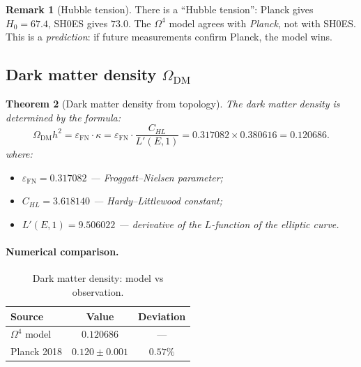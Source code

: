 \documentclass[11pt,a4paper]{article}
\newcommand{\Om}{\Omega^4}
\newcommand{\epsFN}{\varepsilon_{\text{FN}}}
\newtheorem{theorem}{Theorem}[section]
\theoremstyle{definition}
\newtheorem{remark}[theorem]{Remark}
\begin{document}
\begin{remark}[Hubble tension]
\label{rem:hubble-tension}
There is a ``Hubble tension'': Planck gives $H_0 = 67.4$, 
SH0ES gives $73.0$. The $\Om$ model agrees with 
\emph{Planck}, not with SH0ES. This is a \emph{prediction}: 
if future measurements confirm Planck, the model wins.
\end{remark}

\subsection{Dark matter density $\Omega_{\text{DM}}$}
\label{subsec:omega-dm}

\begin{theorem}[Dark matter density from topology]
\label{thm:omega-dm}
The dark matter density is determined by the formula:
\begin{equation}
    \boxed{
    \Omega_{\text{DM}} h^2 = \epsFN \cdot \kappa
    = \epsFN \cdot \frac{C_{HL}}{L'(E, 1)}
    = 0.317082 \times 0.380616 = 0.120686.
    }
    \label{eq:omega-dm-main}
\end{equation}
where:
\begin{itemize}
    \item $\epsFN = 0.317082$ — Froggatt--Nielsen parameter;
    \item $C_{HL} = 3.618140$ — Hardy--Littlewood constant;
    \item $L'(E, 1) = 9.506022$ — derivative of the $L$-function 
          of the elliptic curve.
\end{itemize}
\end{theorem}

\paragraph{Numerical comparison.}
\begin{table}[htbp]
\centering
\caption{Dark matter density: model vs observation.}
\label{tab:omega-dm-comparison}
\begin{tabular}{lcc}
\toprule
Source & Value & Deviation \\ 
\midrule
$\Om$ model & $0.120686$ & --- \\[0.3em]
Planck 2018 & $0.120 \pm 0.001$ & $0.57\%$ \\ 
\bottomrule
\end{tabular}
\end{table}
\end{document}
